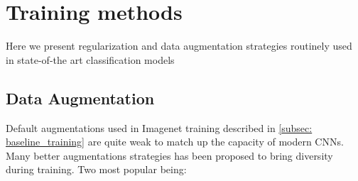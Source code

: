 % 




\section{Training methods}

Here we present regularization and data augmentation strategies routinely used in state-of-the art classification models \cite{lin2020neural_genet} \cite{tan2019_efficientnet} \cite{tan2021_efficientnetv2}

\subsection{Data Augmentation}
Default augmentations used in Imagenet training described in \ref{subsec: baseline_training} are quite weak to match up the capacity of modern CNNs. Many better augmentations strategies has been proposed to bring diversity during training. Two most popular being: 

